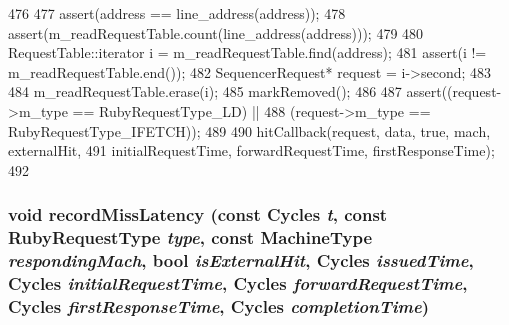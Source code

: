 \begin{DoxyCode}
476 {
477     assert(address == line_address(address));
478     assert(m_readRequestTable.count(line_address(address)));
479 
480     RequestTable::iterator i = m_readRequestTable.find(address);
481     assert(i != m_readRequestTable.end());
482     SequencerRequest* request = i->second;
483 
484     m_readRequestTable.erase(i);
485     markRemoved();
486 
487     assert((request->m_type == RubyRequestType_LD) ||
488            (request->m_type == RubyRequestType_IFETCH));
489 
490     hitCallback(request, data, true, mach, externalHit,
491                 initialRequestTime, forwardRequestTime, firstResponseTime);
492 }
\end{DoxyCode}
\hypertarget{classSequencer_a37b774f897c19e6a2a84d89aeb3f5b45}{
\subsubsection[{recordMissLatency}]{\setlength{\rightskip}{0pt plus 5cm}void recordMissLatency (const {\bf Cycles} {\em t}, \/  const RubyRequestType {\em type}, \/  const MachineType {\em respondingMach}, \/  bool {\em isExternalHit}, \/  {\bf Cycles} {\em issuedTime}, \/  {\bf Cycles} {\em initialRequestTime}, \/  {\bf Cycles} {\em forwardRequestTime}, \/  {\bf Cycles} {\em firstResponseTime}, \/  {\bf Cycles} {\em completionTime})}}
\label{classSequencer_a37b774f897c19e6a2a84d89aeb3f5b45}



